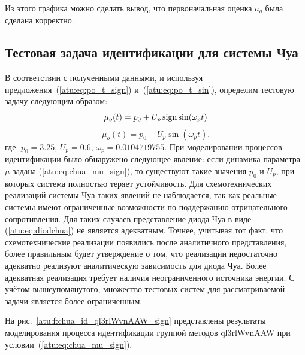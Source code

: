 Из этого графика можно сделать вывод, что первоначальная оценка $a_q$
была сделана корректно.


\subsection{Тестовая задача идентификации для системы Чуа}  %

В соответствии с полученными данными, и используя
предложения~(\ref{atu:eq:po_t_sign}) и~(\ref{atu:eq:po_t_sin}),
определим тестовую задачу следующим образом:
%
\begin{equation}
 \mu_o(t) = p_0 + U_p \operatorname*{sign} \sin( \omega_p t )
  \label{atu:eq:chua_mu_sign}
\end{equation}
%
\begin{equation}
 \mu_o(t) = p_0 + U_p \sin( \omega_p t ).
  \label{atu:eq:chua_mu_sin}
\end{equation}
%
где:
$p_0 = 3.25$, $U_p=0.6$, $\omega_p=0.0104719755$.
При моделировании процессов идентификации было обнаружено
следующее явление: если динамика параметра $\mu$ задана (\ref{atu:eq:chua_mu_sign}),
то существуют такие значения $p_0$ и $U_p$,
при которых система полностью теряет устойчивость.
Для схемотехнических реализаций системы Чуа таких явлений
не наблюдается, так как реальные системы имеют ограниченные возможности
по поддержанию отрицательного сопротивления. Для таких случаев
представление диода Чуа в виде (\ref{atu:eq:diodchua})
не является адекватным. Точнее, учитывая тот факт,
что схемотехнические реализации появились после аналитичного представления,
более правильным будет утверждение о том, что реализации недостаточно адекватно
реализуют аналитическую зависимость для диода Чуа.
Более адекватная реализация требует наличия неограниченного
источника энергии. С учётом вышеупомянутого,
множество тестовых систем для рассматриваемой задачи
является более ограниченным.

На рис.~\ref{atu:f:chua_id_ql3rlWvnAAW_sign} представлены результаты
моделирования процесса идентификации
группой методов ql3rlWvnAAW при условии~(\ref{atu:eq:chua_mu_sign}).

